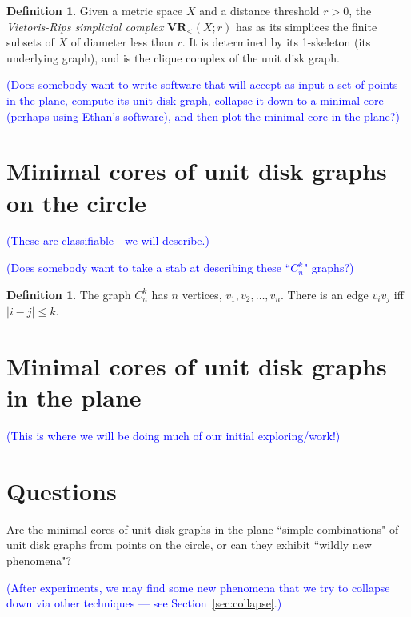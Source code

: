 \documentclass[amscd, amssymb, verbatim]{amsart}[12pt]
\newcommand{\note}[1]{\textcolor{blue}{({#1})}}
\theoremstyle{plain}
\theoremstyle{definition}
\newtheorem{definition}[lemma]{Definition}
\begin{document}
\begin{definition}
Given a metric space $X$ and a distance threshold $r>0$, the \emph{Vietoris-Rips simplicial complex} $\textbf{VR}_{<}(X;r)$ has as its simplices the finite subsets of $X$ of diameter less than $r$. It is determined by its 1-skeleton (its underlying graph), and is the clique complex of the unit disk graph.
\end{definition}

\note{Does somebody want to write software that will accept as input a set of points in the plane, compute its unit disk graph, collapse it down to a minimal core (perhaps using Ethan's software), and then plot the minimal core in the plane?}



\section{Minimal cores of unit disk graphs on the circle}

\note{These are classifiable---we will describe.}

\note{Does somebody want to take a stab at describing these ``$C_n^k$" graphs?}

\begin{definition}
The graph $C_n^k$ has $n$ vertices, $v_1, v_2, \ldots, v_n$. There is an edge $v_iv_j$ iff $|i - j| \leq k$.
\end{definition}

\section{Minimal cores of unit disk graphs in the plane}

\note{This is where we will be doing much of our initial exploring/work!}



\section{Questions}

Are the minimal cores of unit disk graphs in the plane ``simple combinations" of unit disk graphs from points on the circle, or can they exhibit ``wildly new phenomena"?

\note{After experiments, we may find some new phenomena that we try to collapse down via other techniques --- see Section~\ref{sec:collapse}.}
\end{document}

